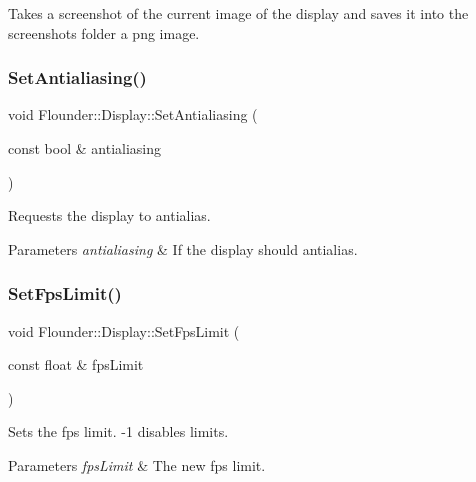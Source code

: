 Takes a screenshot of the current image of the display and saves it into the screenshots folder a png image. 

\mbox{\label{class_flounder_1_1_display_a752c23c8de38e2e3b95cd8485d417955}} 
\subsubsection{\texorpdfstring{Set\+Antialiasing()}{SetAntialiasing()}}
{\footnotesize\ttfamily void Flounder\+::\+Display\+::\+Set\+Antialiasing (\begin{DoxyParamCaption}\item[{const bool \&}]{antialiasing }\end{DoxyParamCaption})\hspace{0.3cm}{\ttfamily [inline]}}



Requests the display to antialias. 


\begin{DoxyParams}{Parameters}
{\em antialiasing} & If the display should antialias. \\
\hline
\end{DoxyParams}
\mbox{\label{class_flounder_1_1_display_ace043fe5dbae9942b3d95609e9f69805}} 
\subsubsection{\texorpdfstring{Set\+Fps\+Limit()}{SetFpsLimit()}}
{\footnotesize\ttfamily void Flounder\+::\+Display\+::\+Set\+Fps\+Limit (\begin{DoxyParamCaption}\item[{const float \&}]{fps\+Limit }\end{DoxyParamCaption})\hspace{0.3cm}{\ttfamily [inline]}}



Sets the fps limit. -\/1 disables limits. 


\begin{DoxyParams}{Parameters}
{\em fps\+Limit} & The new fps limit. \\
\hline
\end{DoxyParams}
\mbox{\label{class_flounder_1_1_display_ade9b02cce9909ae589a79c5d915d2dd1}} 
